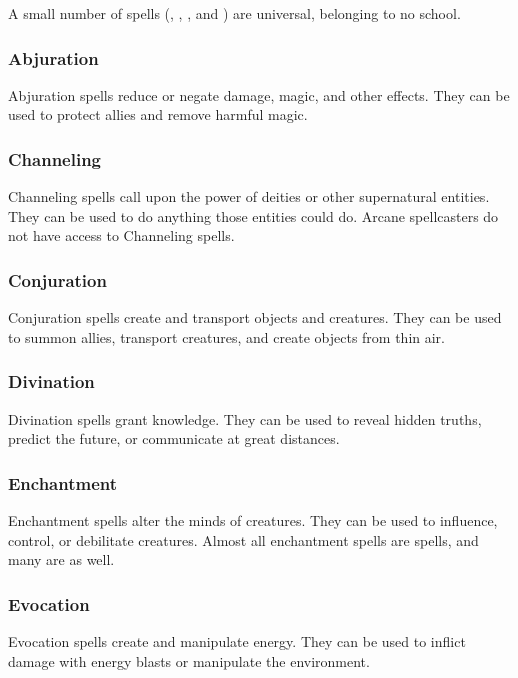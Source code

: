         A small number of spells (, , , and ) are universal, belonging to no school.

        \subsubsection{Abjuration}
            Abjuration spells reduce or negate damage, magic, and other effects.
            They can be used to protect allies and remove harmful magic.

        \subsubsection{Channeling}
            Channeling spells call upon the power of deities or other supernatural entities.
            They can be used to do anything those entities could do.
            Arcane spellcasters do not have access to Channeling spells.

        \subsubsection{Conjuration}
            Conjuration spells create and transport objects and creatures.
            They can be used to summon allies, transport creatures, and create objects from thin air.

        \subsubsection{Divination}
            Divination spells grant knowledge.
            They can be used to reveal hidden truths, predict the future, or communicate at great distances.

        \subsubsection{Enchantment}
            Enchantment spells alter the minds of creatures.
            They can be used to influence, control, or debilitate creatures.
            Almost all enchantment spells are  spells, and many are  as well.

        \subsubsection{Evocation}
            Evocation spells create and manipulate energy.
            They can be used to inflict damage with energy blasts or manipulate the environment.

